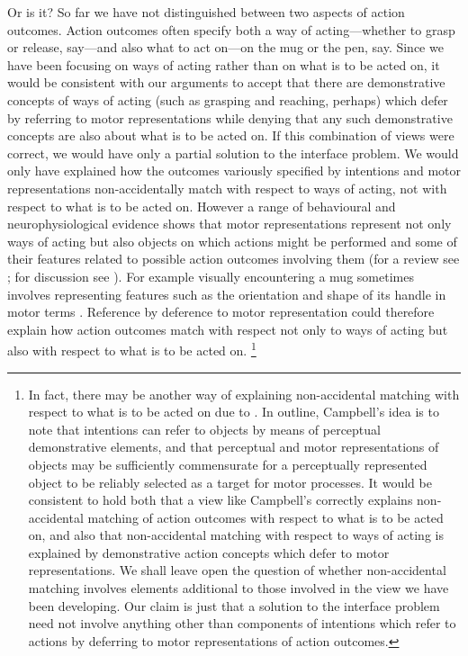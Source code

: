 \documentclass[12pt,\papersize]{extarticle}
\begin{document}
Or is it? So far we have not distinguished between two aspects of action outcomes.  Action outcomes often specify both a way of acting---whether to grasp or release, say---and also what to act on---on the mug or the pen, say.  Since we have been focusing on ways of acting rather than on what is to be acted on, it would be consistent with our arguments to accept that there are demonstrative concepts of ways of acting (such as grasping and reaching, perhaps) which defer by referring to motor representations while denying that any such demonstrative concepts are also about what is to be acted on. If this combination of views were correct, we would have only a partial solution to the interface problem. We would only have explained how the outcomes variously specified by intentions and motor representations non-accidentally match with respect to ways of acting, not with respect to what is to be acted on. However a range of behavioural and neurophysiological evidence shows that motor representations represent not only ways of acting but also objects on which actions might be performed and some of their features related to possible action outcomes involving them (for a review see \citealp{Gallese:2011uq}; for discussion see \citealp[pp.\ 410-3]{pacherie:2000_content}). For example visually encountering a mug sometimes involves representing features such as the orientation and shape of its handle in motor terms \citep{buccino:2009_broken,costantini:2010_where,cardellicchio:2011_space,Tucker:1998,tucker:2001_potentiation}. Reference by deference to motor representation could therefore explain how action outcomes match with respect not only to ways of acting but also with respect to what is to be acted on.%
\footnote{ In fact, there may be another way of explaining non-accidental matching with respect to what is to be acted on due to \citet[pp.\ 36-8, 44-5, 48-57]{Campbell:2002ge}. In outline, Campbell's idea is to note that intentions can refer to objects by means of perceptual demonstrative elements, and that perceptual and motor representations of objects may be sufficiently commensurate for a perceptually represented object to be reliably selected as a target for motor processes.  It would be consistent to hold both that a view like Campbell's correctly explains non-accidental matching of action outcomes with respect to what is to be acted on, and also that non-accidental matching with respect to ways of acting is explained by demonstrative action concepts which defer to motor representations. We shall leave open the question of whether non-accidental matching involves elements additional to those involved in the view we have been developing.  Our claim is just that a solution to the interface problem need not involve anything other than components of intentions which refer to actions by deferring to motor representations of action outcomes.
}
\end{document}
